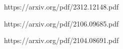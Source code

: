  https://arxiv.org/pdf/2312.12148.pdf

\noindent{} https://arxiv.org/pdf/2106.09685.pdf

\noindent{} https://arxiv.org/pdf/2104.08691.pdf